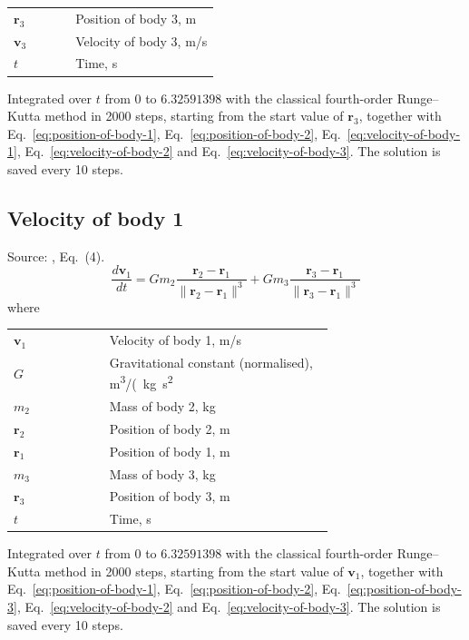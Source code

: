 \noindent\begin{tabular}{@{\quad}l@{\quad}p{0.7\linewidth}@{}}
  $\mathbf{r}_3$ & Position of body 3, \si{m} \\
  $\mathbf{v}_3$ & Velocity of body 3, \si{m/s} \\
  $t$ & Time, \si{s} \\
\end{tabular}

\noindent Integrated over $t$ from $0$ to $6.32591398$ with the classical fourth-order Runge–Kutta method in 2000 steps, starting from the start value of $\mathbf{r}_3$, together with Eq.~\eqref{eq:position-of-body-1}, Eq.~\eqref{eq:position-of-body-2}, Eq.~\eqref{eq:velocity-of-body-1}, Eq.~\eqref{eq:velocity-of-body-2} and Eq.~\eqref{eq:velocity-of-body-3}. The solution is saved every 10 steps.

\subsection{Velocity of body 1}
Source: \cite{chenciner2000}, Eq.~(4).
\begin{equation}
  \frac{d\mathbf{v}_1}{dt} = G m_2 \frac{\mathbf{r}_2 - \mathbf{r}_1}{\|\mathbf{r}_2 - \mathbf{r}_1\|^3} + G m_3 \frac{\mathbf{r}_3 - \mathbf{r}_1}{\|\mathbf{r}_3 - \mathbf{r}_1\|^3}
  \label{eq:velocity-of-body-1}
\end{equation}
\noindent where

\noindent\begin{tabular}{@{\quad}l@{\quad}p{0.7\linewidth}@{}}
  $\mathbf{v}_1$ & Velocity of body 1, \si{m/s} \\
  $G$ & Gravitational constant (normalised), \si{m^{3}/(kg.s^{2}} \\
  $m_2$ & Mass of body 2, \si{kg} \\
  $\mathbf{r}_2$ & Position of body 2, \si{m} \\
  $\mathbf{r}_1$ & Position of body 1, \si{m} \\
  $m_3$ & Mass of body 3, \si{kg} \\
  $\mathbf{r}_3$ & Position of body 3, \si{m} \\
  $t$ & Time, \si{s} \\
\end{tabular}

\noindent Integrated over $t$ from $0$ to $6.32591398$ with the classical fourth-order Runge–Kutta method in 2000 steps, starting from the start value of $\mathbf{v}_1$, together with Eq.~\eqref{eq:position-of-body-1}, Eq.~\eqref{eq:position-of-body-2}, Eq.~\eqref{eq:position-of-body-3}, Eq.~\eqref{eq:velocity-of-body-2} and Eq.~\eqref{eq:velocity-of-body-3}. The solution is saved every 10 steps.

